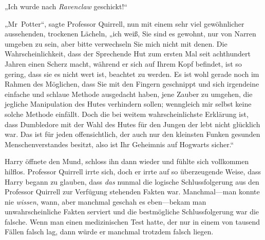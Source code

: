 „Ich wurde nach \emph{Ravenclaw} geschickt!“

„Mr~Potter“, sagte Professor Quirrell, nun mit einem sehr viel gewöhnlicher aussehenden, trockenen Lächeln, „ich weiß, Sie sind es gewohnt, nur von Narren umgeben zu sein, aber bitte verwechseln Sie mich nicht mit denen. Die Wahrscheinlichkeit, dass der Sprechende Hut zum ersten Mal seit achthundert Jahren einen Scherz macht, während er sich auf Ihrem Kopf befindet, ist so gering, dass sie es nicht wert ist, beachtet zu werden. Es ist wohl gerade noch im Rahmen des Möglichen, dass Sie mit den Fingern geschnippt und sich irgendeine einfache und schlaue Methode ausgedacht haben, jene Zauber zu umgehen, die jegliche Manipulation des Hutes verhindern sollen; wenngleich mir selbst keine solche Methode einfällt. Doch die bei weitem wahrscheinlichste Erklärung ist, dass Dumbledore mit der Wahl des Hutes für den Jungen der lebt nicht glücklich war. Das ist für jeden offensichtlich, der auch nur den kleinsten Funken gesunden Menschenverstandes besitzt, also ist Ihr Geheimnis auf Hogwarts sicher.“

Harry öffnete den Mund, schloss ihn dann wieder und fühlte sich vollkommen hilflos. Professor Quirrell irrte sich, doch er irrte auf so überzeugende Weise, dass Harry begann zu glauben, dass \emph{das} nunmal die logische Schlussfolgerung aus den Professor Quirrell zur Verfügung stehenden Fakten war. Manchmal—man konnte nie \emph{wissen}, wann, aber manchmal geschah es eben—bekam man unwahrscheinliche Fakten serviert und die bestmögliche Schlussfolgerung war die falsche. Wenn man einen medizinischen Test hatte, der nur in einem von tausend Fällen falsch lag, dann würde er manchmal trotzdem falsch liegen.

